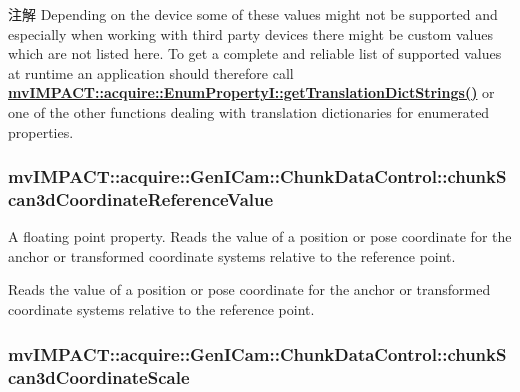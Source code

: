 \begin{DoxyNote}{注解}
Depending on the device some of these values might not be supported and especially when working with third party devices there might be custom values which are not listed here. To get a complete and reliable list of supported values at runtime an application should therefore call {\bfseries \hyperlink{classmv_i_m_p_a_c_t_1_1acquire_1_1_enum_property_i_a0ba6ccbf5ee69784d5d0b537924d26b6}{mv\+I\+M\+P\+A\+C\+T\+::acquire\+::\+Enum\+Property\+I\+::get\+Translation\+Dict\+Strings()}} or one of the other functions dealing with translation dictionaries for enumerated properties. 
\end{DoxyNote}
\hypertarget{classmv_i_m_p_a_c_t_1_1acquire_1_1_gen_i_cam_1_1_chunk_data_control_aa45a547729c3dac4c8b8b0348c1c1bdd}{
\subsubsection[{chunk\+Scan3d\+Coordinate\+Reference\+Value}]{ mv\+I\+M\+P\+A\+C\+T\+::acquire\+::\+Gen\+I\+Cam\+::\+Chunk\+Data\+Control\+::chunk\+Scan3d\+Coordinate\+Reference\+Value}}\label{classmv_i_m_p_a_c_t_1_1acquire_1_1_gen_i_cam_1_1_chunk_data_control_aa45a547729c3dac4c8b8b0348c1c1bdd}


A floating point property. Reads the value of a position or pose coordinate for the anchor or transformed coordinate systems relative to the reference point. 

Reads the value of a position or pose coordinate for the anchor or transformed coordinate systems relative to the reference point. \hypertarget{classmv_i_m_p_a_c_t_1_1acquire_1_1_gen_i_cam_1_1_chunk_data_control_a652394e0ffd066f97020683b5640c399}{
\subsubsection[{chunk\+Scan3d\+Coordinate\+Scale}]{ mv\+I\+M\+P\+A\+C\+T\+::acquire\+::\+Gen\+I\+Cam\+::\+Chunk\+Data\+Control\+::chunk\+Scan3d\+Coordinate\+Scale}}\label{classmv_i_m_p_a_c_t_1_1acquire_1_1_gen_i_cam_1_1_chunk_data_control_a652394e0ffd066f97020683b5640c399}


